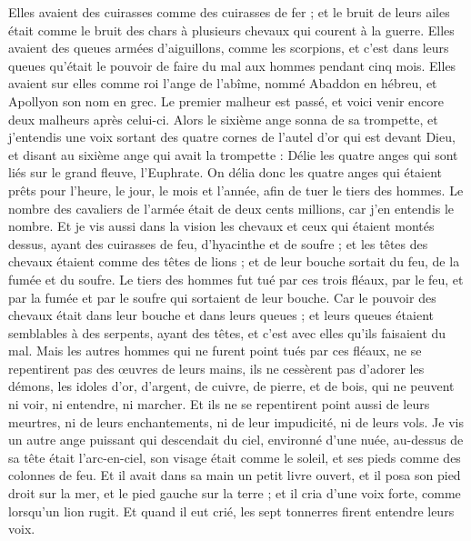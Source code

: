 \begin{multicols}{2}
Elles avaient des cuirasses comme des cuirasses de fer ; et le bruit de leurs ailes était comme le bruit des chars à plusieurs chevaux qui courent à la guerre.
Elles avaient des queues armées d'aiguillons, comme les scorpions, et c'est dans leurs queues qu'était le pouvoir de faire du mal aux hommes pendant cinq mois.
Elles avaient sur elles comme roi l'ange de l'abîme, nommé Abaddon en hébreu, et Apollyon son nom en grec.
Le premier malheur est passé, et voici venir encore deux malheurs après celui-ci.
Alors le sixième ange sonna de sa trompette, et j'entendis une voix sortant des quatre cornes de l'autel d'or qui est devant Dieu,
et disant au sixième ange qui avait la trompette : Délie les quatre anges qui sont liés sur le grand fleuve, l'Euphrate.
On délia donc les quatre anges qui étaient prêts pour l'heure, le jour, le mois et l'année, afin de tuer le tiers des hommes.
Le nombre des cavaliers de l'armée était de deux cents millions, car j'en entendis le nombre.
Et je vis aussi dans la vision les chevaux et ceux qui étaient montés dessus, ayant des cuirasses de feu, d'hyacinthe et de soufre ; et les têtes des chevaux étaient comme des têtes de lions ; et de leur bouche sortait du feu, de la fumée et du soufre.
Le tiers des hommes fut tué par ces trois fléaux, par le feu, et par la fumée et par le soufre qui sortaient de leur bouche.
Car le pouvoir des chevaux était dans leur bouche et dans leurs queues ; et leurs queues étaient semblables à des serpents, ayant des têtes, et c'est avec elles qu'ils faisaient du mal.
Mais les autres hommes qui ne furent point tués par ces fléaux, ne se repentirent pas des œuvres de leurs mains, ils ne cessèrent pas d'adorer les démons, les idoles d'or, d'argent, de cuivre, de pierre, et de bois, qui ne peuvent ni voir, ni entendre, ni marcher.
Et ils ne se repentirent point aussi de leurs meurtres, ni de leurs enchantements, ni de leur impudicité, ni de leurs vols.
\VerseOne{}Je vis un autre ange puissant qui descendait du ciel, environné d'une nuée, au-dessus de sa tête était l'arc-en-ciel, son visage était comme le soleil, et ses pieds comme des colonnes de feu.
Et il avait dans sa main un petit livre ouvert, et il posa son pied droit sur la mer, et le pied gauche sur la terre ;
et il cria d'une voix forte, comme lorsqu'un lion rugit. Et quand il eut crié, les sept tonnerres firent entendre leurs voix.

\end{multicols}
